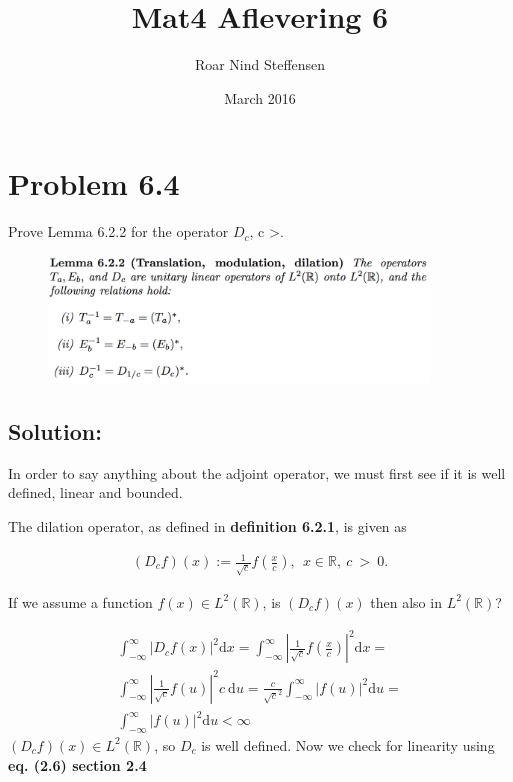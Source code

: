 \documentclass{article}
\title{Mat4 Aflevering 6}
\author{Roar Nind Steffensen}
\date{March 2016}
\begin{document}
\maketitle

\section*{Problem 6.4}
Prove Lemma 6.2.2 for the operator $D_c$, c \textgreater {}.
\begin{figure}[H]
    \includegraphics[width=0.9\textwidth]{fig/lemma622}
\end{figure}

\subsection*{Solution:}
In order to say anything about the adjoint operator, we must first see if it is well defined, linear and bounded. 

The dilation operator, as defined in \textbf{definition 6.2.1}, is given as

\begin{gather*}
    (D_c f)(x):= \frac{1}{\sqrt{c}}f(\frac{x}{c}), \: \: x \in \mathbb{R},\: c \: > \: 0.
\end{gather*}

If we assume a function $f(x) \in L^2(\mathbb{R})$, is $(D_c f)(x)$ then also in $L^2(\mathbb{R})$?

\begin{gather*}
    \int_{-\infty}^{\infty} |D_c f(x)|^2 \text{d}x = \int_{-\infty}^{\infty} \left|\frac{1}{\sqrt{c}}f(\frac{x}{c})\right|^2 \text{d}x = \\
    \int_{-\infty}^{\infty} \left|\frac{1}{\sqrt{c}}f(u)\right|^2 c\:\text{d}u = 
    \frac{c}{\sqrt{c}^2}\int_{-\infty}^{\infty} \left|f(u)\right|^2 \text{d}u = \\
    \int_{-\infty}^{\infty} \left|f(u)\right|^2 \text{d}u < \infty
\end{gather*}
$(D_c f)(x) \in L^2(\mathbb{R})$, so $D_c$ is well defined. Now we check for linearity using \textbf{eq. (2.6) section 2.4}
\end{document}
